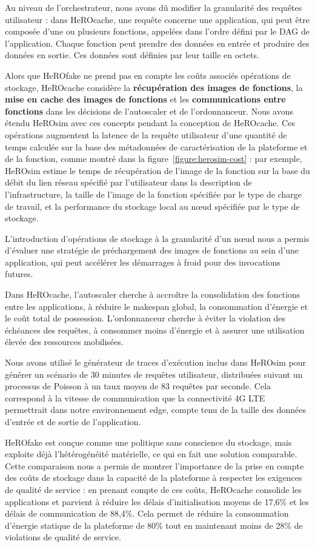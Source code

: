 Au niveau de l'orchestrateur, nous avons dû modifier la granularité des requêtes utilisateur : dans HeROcache, une requête concerne une application, qui peut être composée d'une ou plusieurs fonctions, appelées dans l'ordre défini par le DAG de l'application. Chaque fonction peut prendre des données en entrée et produire des données en sortie. Ces données sont définies par leur taille en octets.

Alors que HeROfake ne prend pas en compte les coûts associés opérations de stockage, HeROcache considère la \textbf{récupération des images de fonctions}, la \textbf{mise en cache des images de fonctions} et les \textbf{communications entre fonctions} dans les décisions de l'autoscaler et de l'ordonnanceur. Nous avons étendu HeROsim avec ces concepts pendant la conception de HeROcache. Ces opérations augmentent la latence de la requête utilisateur d'une quantité de temps calculée sur la base des métadonnées de caractérisation de la plateforme et de la fonction, comme montré dans la figure~\ref{figure:herosim-cost} : par exemple, HeROsim estime le temps de récupération de l'image de la fonction sur la base du débit du lien réseau spécifié par l'utilisateur dans la description de l'infrastructure, la taille de l'image de la fonction spécifiée par le type de charge de travail, et la performance du stockage local au nœud spécifiée par le type de stockage.

L'introduction d'opérations de stockage à la granularité d'un nœud nous a permis d'évaluer une stratégie de préchargement des images de fonctions au sein d'une application, qui peut accélérer les démarrages à froid pour des invocations futures.

Dans HeROcache, l'autoscaler cherche à accroître la consolidation des fonctions entre les applications, à réduire le makespan global, la consommation d'énergie et le coût total de possession. L'ordonnanceur cherche à éviter la violation des échéances des requêtes, à consommer moins d'énergie et à assurer une utilisation élevée des ressources mobilisées.

Nous avons utilisé le générateur de traces d'exécution inclus dans HeROsim pour générer un scénario de 30 minutes de requêtes utilisateur, distribuées suivant un processus de Poisson à un taux moyen de 83 requêtes par seconde. Cela correspond à la vitesse de communication que la connectivité 4G LTE permettrait dans notre environnement edge, compte tenu de la taille des données d'entrée et de sortie de l'application.

HeROfake est conçue comme une politique sans conscience du stockage, mais exploite déjà l'hétérogénéité matérielle, ce qui en fait une solution comparable. Cette comparaison nous a permis de montrer l'importance de la prise en compte des coûts de stockage dans la capacité de la plateforme à respecter les exigences de qualité de service : en prenant compte de ces coûts, HeROcache consolide les applications et parvient à réduire les délais d'initialisation moyens de 17,6\% et les délais de communication de 88,4\%. Cela permet de réduire la consommation d'énergie statique de la plateforme de 80\% tout en maintenant moins de 28\% de violations de qualité de service.

